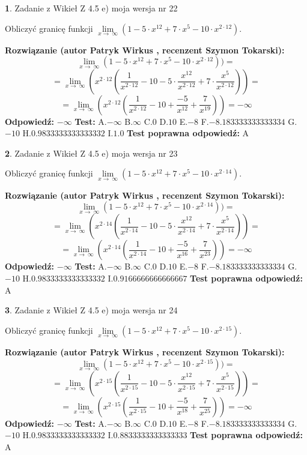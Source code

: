 \documentclass[12pt, a4paper]{article}
\theoremstyle{definition} %
\newtheorem{zad}{}
\newcommand{\zadStart}[1]{\begin{zad}#1\newline}
\newcommand{\zadStop}{\end{zad}}
\newcommand{\rozwStart}[2]{\noindent \textbf{Rozwiązanie (autor #1 , recenzent #2): }\newline}
\newcommand{\rozwStop}{\newline}
\newcommand{\odpStart}{\noindent \textbf{Odpowiedź:}\newline}
\newcommand{\odpStop}{\newline}
\newcommand{\testStart}{\noindent \textbf{Test:}\newline}
\newcommand{\testStop}{\newline}
\newcommand{\kluczStart}{\noindent \textbf{Test poprawna odpowiedź:}\newline}
\newcommand{\kluczStop}{\newline}
\begin{document}
\zadStart{Zadanie z Wikieł Z 4.5 e) moja wersja nr 22}


Obliczyć granicę funkcji  $\lim\limits_{x\to\ \infty}(1 - 5 \cdot x^{12}+7 \cdot x^{5}- 10 \cdot x^{2\cdot12})$.
\zadStop
\rozwStart{Patryk Wirkus}{Szymon Tokarski}
$$\lim\limits_{x\to\ \infty}(1 - 5 \cdot x^{12}+7 \cdot x^{5}- 10 \cdot x^{2\cdot12}))=$$
$$=\lim\limits_{x\to\ \infty}(x^{2\cdot12}(\frac{1}{x^{2\cdot12}}-10 -5 \cdot \frac{x^{12}}{x^{2\cdot12}}+7 \cdot \frac{x^{5}}{x^{2\cdot12}}))=$$
$$=\lim\limits_{x\to\ \infty}(x^{2\cdot12}(\frac{1}{x^{2\cdot12}}-10 + \frac{-5}{x^{12}}+ \frac{7}{x^{19}}))=-\infty$$
\rozwStop
\odpStart
$-\infty$
\odpStop
\testStart
A.$-\infty$ B.$\infty$ C.$0$ D.$10$ E.$-8$
F.$-8.183333333333334$ G.$-10$
H.$0.9833333333333332$
I.$1.0$
\testStop
\kluczStart
A
\kluczStop



\zadStart{Zadanie z Wikieł Z 4.5 e) moja wersja nr 23}


Obliczyć granicę funkcji  $\lim\limits_{x\to\ \infty}(1 - 5 \cdot x^{12}+7 \cdot x^{5}- 10 \cdot x^{2\cdot14})$.
\zadStop
\rozwStart{Patryk Wirkus}{Szymon Tokarski}
$$\lim\limits_{x\to\ \infty}(1 - 5 \cdot x^{12}+7 \cdot x^{5}- 10 \cdot x^{2\cdot14}))=$$
$$=\lim\limits_{x\to\ \infty}(x^{2\cdot14}(\frac{1}{x^{2\cdot14}}-10 -5 \cdot \frac{x^{12}}{x^{2\cdot14}}+7 \cdot \frac{x^{5}}{x^{2\cdot14}}))=$$
$$=\lim\limits_{x\to\ \infty}(x^{2\cdot14}(\frac{1}{x^{2\cdot14}}-10 + \frac{-5}{x^{16}}+ \frac{7}{x^{23}}))=-\infty$$
\rozwStop
\odpStart
$-\infty$
\odpStop
\testStart
A.$-\infty$ B.$\infty$ C.$0$ D.$10$ E.$-8$
F.$-8.183333333333334$ G.$-10$
H.$0.9833333333333332$
I.$0.9166666666666667$
\testStop
\kluczStart
A
\kluczStop



\zadStart{Zadanie z Wikieł Z 4.5 e) moja wersja nr 24}


Obliczyć granicę funkcji  $\lim\limits_{x\to\ \infty}(1 - 5 \cdot x^{12}+7 \cdot x^{5}- 10 \cdot x^{2\cdot15})$.
\zadStop
\rozwStart{Patryk Wirkus}{Szymon Tokarski}
$$\lim\limits_{x\to\ \infty}(1 - 5 \cdot x^{12}+7 \cdot x^{5}- 10 \cdot x^{2\cdot15}))=$$
$$=\lim\limits_{x\to\ \infty}(x^{2\cdot15}(\frac{1}{x^{2\cdot15}}-10 -5 \cdot \frac{x^{12}}{x^{2\cdot15}}+7 \cdot \frac{x^{5}}{x^{2\cdot15}}))=$$
$$=\lim\limits_{x\to\ \infty}(x^{2\cdot15}(\frac{1}{x^{2\cdot15}}-10 + \frac{-5}{x^{18}}+ \frac{7}{x^{25}}))=-\infty$$
\rozwStop
\odpStart
$-\infty$
\odpStop
\testStart
A.$-\infty$ B.$\infty$ C.$0$ D.$10$ E.$-8$
F.$-8.183333333333334$ G.$-10$
H.$0.9833333333333332$
I.$0.8833333333333333$
\testStop
\kluczStart
A
\kluczStop
\end{document}
